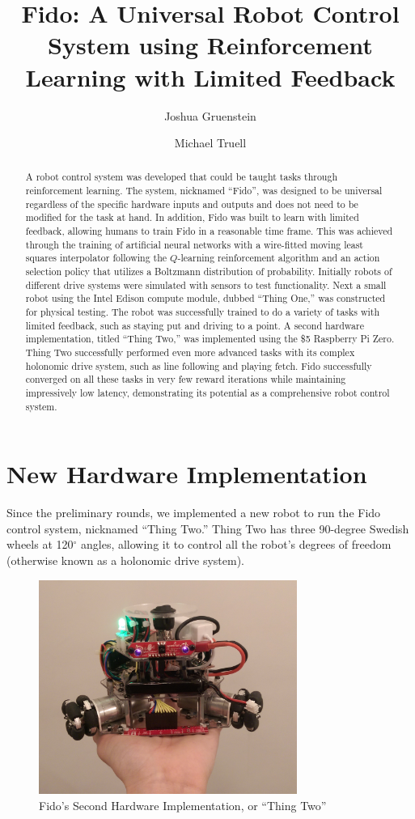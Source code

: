 \documentclass[letterpaper,11pt]{article}
\title{Fido: A Universal Robot Control System using Reinforcement Learning with Limited Feedback}
\author{Joshua Gruenstein \and Michael Truell}
\date{}
\begin{document}
	\maketitle

	\begin{abstract}
		A robot control system was developed that could be taught tasks through reinforcement learning.  The system, nicknamed ``Fido'', was designed to be universal regardless of the specific hardware inputs and outputs and does not need to be modified for the task at hand. In addition, Fido was built to learn with limited feedback, allowing humans to train Fido in a reasonable time frame. This was achieved through the training of artificial neural networks with a wire-fitted moving least squares interpolator following the $Q$-learning reinforcement algorithm and an action selection policy that utilizes a Boltzmann distribution of probability.  Initially robots of different drive systems were simulated with sensors to test functionality.  Next a small robot using the Intel Edison compute module, dubbed ``Thing One,'' was constructed for physical testing.  The robot was successfully trained to do a variety of tasks with limited feedback, such as staying put and driving to a point.   A second hardware implementation, titled ``Thing Two,'' was implemented using the \$5 Raspberry Pi Zero.  Thing Two successfully performed even more advanced tasks with its complex holonomic drive system, such as line following and playing fetch. Fido successfully converged on all these tasks in very few reward iterations while maintaining impressively low latency, demonstrating its potential as a comprehensive robot control system.
	\end{abstract}

	\section*{New Hardware Implementation}

	Since the preliminary rounds, we implemented a new robot to run the Fido control system, nicknamed ``Thing Two.''  Thing Two has three 90-degree Swedish wheels at 120$^{\circ}$ angles, allowing it to control all the robot's degrees of freedom (otherwise known as a holonomic drive system).

	\begin{figure}[ht]
		\centering
		\includegraphics[height=7cm]{ThingTwo.png}
		\caption{Fido's Second Hardware Implementation, or ``Thing Two''}
	\end{figure}
\end{document}
